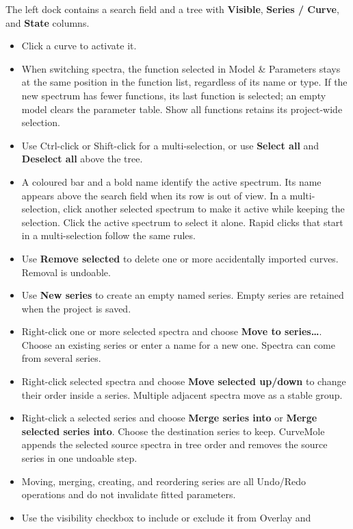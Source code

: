 \documentclass[
  10pt,
  a4paper,
  oneside]{scrreprt}
\providecommand{\tightlist}{%
  \setlength{\itemsep}{0pt}\setlength{\parskip}{0pt}}
\begin{document}
The left dock contains a search field and a tree with \textbf{Visible},
\textbf{Series / Curve}, and \textbf{State} columns.

\begin{itemize}
\tightlist
\item
  Click a curve to activate it.
\item
  When switching spectra, the function selected in Model \& Parameters
  stays at the same position in the function list, regardless of its
  name or type. If the new spectrum has fewer functions, its last
  function is selected; an empty model clears the parameter table. Show
  all functions retains its project-wide selection.
\item
  Use Ctrl-click or Shift-click for a multi-selection, or use
  \textbf{Select all} and \textbf{Deselect all} above the tree.
\item
  A coloured bar and a bold name identify the active spectrum. Its name
  appears above the search field when its row is out of view. In a
  multi-selection, click another selected spectrum to make it active
  while keeping the selection. Click the active spectrum to select it
  alone. Rapid clicks that start in a multi-selection follow the same
  rules.
\item
  Use \textbf{Remove selected} to delete one or more accidentally
  imported curves. Removal is undoable.
\item
  Use \textbf{New series} to create an empty named series. Empty series
  are retained when the project is saved.
\item
  Right-click one or more selected spectra and choose \textbf{Move to
  series\ldots{}}. Choose an existing series or enter a name for a new
  one. Spectra can come from several series.
\item
  Right-click selected spectra and choose \textbf{Move selected up/down}
  to change their order inside a series. Multiple adjacent spectra move
  as a stable group.
\item
  Right-click a selected series and choose \textbf{Merge series into} or
  \textbf{Merge selected series into}. Choose the destination series to
  keep. CurveMole appends the selected source spectra in tree order and
  removes the source series in one undoable step.
\item
  Moving, merging, creating, and reordering series are all Undo/Redo
  operations and do not invalidate fitted parameters.
\item
  Use the visibility checkbox to include or exclude it from Overlay and

\end{itemize}
\end{document}
